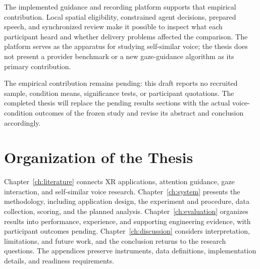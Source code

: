 The implemented guidance and recording platform supports that empirical contribution. Local spatial eligibility, constrained agent decisions, prepared speech, and synchronized review make it possible to inspect what each participant heard and whether delivery problems affected the comparison. The platform serves as the apparatus for studying self-similar voice; the thesis does not present a provider benchmark or a new gaze-guidance algorithm as its primary contribution.

The empirical contribution remains pending: this draft reports no recruited sample, condition means, significance tests, or participant quotations. The completed thesis will replace the pending results sections with the actual voice-condition outcomes of the frozen study and revise its abstract and conclusion accordingly.

\section{Organization of the Thesis}
Chapter~\ref{ch:literature} connects XR applications, attention guidance, gaze interaction, and self-similar voice research. Chapter~\ref{ch:system} presents the methodology, including application design, the experiment and procedure, data collection, scoring, and the planned analysis. Chapter~\ref{ch:evaluation} organizes results into performance, experience, and supporting engineering evidence, with participant outcomes pending. Chapter~\ref{ch:discussion} considers interpretation, limitations, and future work, and the conclusion returns to the research questions. The appendices preserve instruments, data definitions, implementation details, and readiness requirements.
